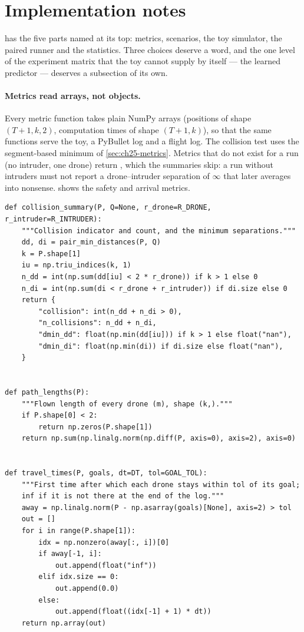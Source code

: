 \section{Implementation notes}
\label{sec:ch25-implementation}

 has the five parts named at its top: metrics,
scenarios, the toy simulator, the paired runner and the statistics. Three
choices deserve a word, and the one level of the experiment matrix that the
toy cannot supply by itself --- the learned predictor --- deserves a
subsection of its own.

\paragraph{Metrics read arrays, not objects.}
Every metric function takes plain NumPy arrays (positions of shape
$(T+1, k, 2)$, computation times of shape $(T+1, k)$), so that the same
functions serve the toy, a PyBullet log and a flight log. The collision test
uses the segment-based minimum of \cref{sec:ch25-metrics}. Metrics that
do not exist for a run (no intruder, one drone) return , which
the summaries skip: a run without intruders must not report a
drone--intruder separation of $\infty$ that later averages into nonsense.
 shows the safety and arrival metrics.

\begin{lstlisting}[caption={Safety and arrival metrics (from \code{code/ch25\_evaluation.py}). Minimum separations use linear motion between samples.},label={lst:ch25-metrics}]
def collision_summary(P, Q=None, r_drone=R_DRONE, r_intruder=R_INTRUDER):
    """Collision indicator and count, and the minimum separations."""
    dd, di = pair_min_distances(P, Q)
    k = P.shape[1]
    iu = np.triu_indices(k, 1)
    n_dd = int(np.sum(dd[iu] < 2 * r_drone)) if k > 1 else 0
    n_di = int(np.sum(di < r_drone + r_intruder)) if di.size else 0
    return {
        "collision": int(n_dd + n_di > 0),
        "n_collisions": n_dd + n_di,
        "dmin_dd": float(np.min(dd[iu])) if k > 1 else float("nan"),
        "dmin_di": float(np.min(di)) if di.size else float("nan"),
    }


def path_lengths(P):
    """Flown length of every drone (m), shape (k,)."""
    if P.shape[0] < 2:
        return np.zeros(P.shape[1])
    return np.sum(np.linalg.norm(np.diff(P, axis=0), axis=2), axis=0)


def travel_times(P, goals, dt=DT, tol=GOAL_TOL):
    """First time after which each drone stays within tol of its goal;
    inf if it is not there at the end of the log."""
    away = np.linalg.norm(P - np.asarray(goals)[None], axis=2) > tol
    out = []
    for i in range(P.shape[1]):
        idx = np.nonzero(away[:, i])[0]
        if away[-1, i]:
            out.append(float("inf"))
        elif idx.size == 0:
            out.append(0.0)
        else:
            out.append(float((idx[-1] + 1) * dt))
    return np.array(out)
\end{lstlisting}

